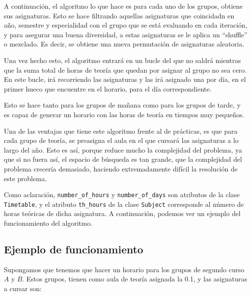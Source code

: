 A continuación, el algoritmo lo que hace es para cada uno de los grupos, obtiene sus asignaturas. Esto se hace filtrando aquellas asignaturas que coincidadn en año, semestre y especialidad con el grupo que se está evaluando en cada iteración, y para asegurar una buena diversidad, a estas asignaturas se le aplica un ``shuffle'' o mezclado. Es decir, se obtiene una nueva permutación de asignaturas aleatoria.

Una vez hecho esto, el algoritmo entrará en un bucle del que no saldrá mientras que la suma total de horas de teoría que quedan por asignar al grupo no sea cero. En este bucle, irá recorriendo las asignaturas y las irá asignado una por día, en el primer hueco que encuentre en el horario, para el día correspondiente.

Esto se hace tanto para los grupos de mañana como para los grupos de tarde, y es capaz de generar un horario con las horas de teoría en tiempos muy pequeños.

Una de las ventajas que tiene este algoritmo frente al de prácticas, es que para cada grupo de teoría, se preasigna el aula en el que cursará las asignaturas a lo largo del año. Esto es así, porque reduce mucho la complejidad del problema, ya que si no fuera así, el espacio de búsqueda es tan grande, que la complejidad del problema crecería demasiado, haciendo extremadamente difícil la resolución de este problema.

Como aclaración, \texttt{number\_of\_hours} y \texttt{number\_of\_days} son atributos de la clase \texttt{Timetable}, y el atributo \texttt{th\_hours} de la clase \texttt{Subject} corresponde al número de horas teóricas de dicha asignatura. A continuación, podemos ver un ejemplo del funcionamiento del algoritmo.


\subsection{Ejemplo de funcionamiento}
Supongamos que tenemos que hacer un horario para los grupos de segundo curso $A$ y $B$. Estos grupos, tienen como aula de teoría asignada la 0.1, y las asignaturas a cursar son:

